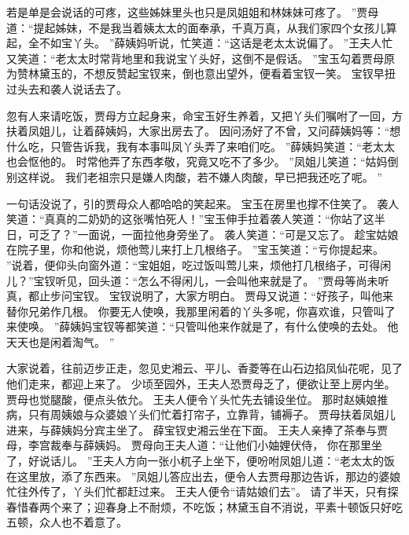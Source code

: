 若是单是会说话的可疼，这些姊妹里头也只是凤姐姐和林妹妹可疼了。
”贾母道：“提起姊妹，不是我当着姨太太的面奉承，千真万真，从我们家四个女孩儿算起，全不如宝丫头。
”薛姨妈听说，忙笑道：“这话是老太太说偏了。
”王夫人忙又笑道：“老太太时常背地里和我说宝丫头好，这倒不是假话。
”宝玉勾着贾母原为赞林黛玉的，不想反赞起宝钗来，倒也意出望外，便看着宝钗一笑。
宝钗早扭过头去和袭人说话去了。
\par
忽有人来请吃饭，贾母方立起身来，命宝玉好生养着，又把丫头们嘱咐了一回，方扶着凤姐儿，让着薛姨妈，大家出房去了。
因问汤好了不曾，又问薛姨妈等：“想什么吃，只管告诉我，我有本事叫凤丫头弄了来咱们吃。
”薛姨妈笑道：“老太太也会怄他的。
时常他弄了东西孝敬，究竟又吃不了多少。
”凤姐儿笑道：“姑妈倒别这样说。
我们老祖宗只是嫌人肉酸，若不嫌人肉酸，早已把我还吃了呢。
”\par
一句话没说了，引的贾母众人都哈哈的笑起来。
宝玉在房里也撑不住笑了。
袭人笑道：“真真的二奶奶的这张嘴怕死人！”宝玉伸手拉着袭人笑道：“你站了这半日，可乏了？”一面说，一面拉他身旁坐了。
袭人笑道：“可是又忘了。
趁宝姑娘在院子里，你和他说，烦他莺儿来打上几根络子。
”宝玉笑道：“亏你提起来。
”说着，便仰头向窗外道：“宝姐姐，吃过饭叫莺儿来，烦他打几根络子，可得闲儿？”宝钗听见，回头道：“怎么不得闲儿，一会叫他来就是了。
”贾母等尚未听真，都止步问宝钗。
宝钗说明了，大家方明白。
贾母又说道：“好孩子，叫他来替你兄弟作几根。
你要无人使唤，我那里闲着的丫头多呢，你喜欢谁，只管叫了来使唤。
”薛姨妈宝钗等都笑道：“只管叫他来作就是了，有什么使唤的去处。
他天天也是闲着淘气。
”\par
大家说着，往前迈步正走，忽见史湘云、平儿、香菱等在山石边掐凤仙花呢，见了他们走来，都迎上来了。
少顷至园外，王夫人恐贾母乏了，便欲让至上房内坐。
贾母也觉腿酸，便点头依允。
王夫人便令丫头忙先去铺设坐位。
那时赵姨娘推病，只有周姨娘与众婆娘丫头们忙着打帘子，立靠背，铺褥子。
贾母扶着凤姐儿进来，与薛姨妈分宾主坐了。
薛宝钗史湘云坐在下面。
王夫人亲捧了茶奉与贾母，李宫裁奉与薛姨妈。
贾母向王夫人道：“让他们小妯娌伏侍，
你在那里坐了，好说话儿。
”王夫人方向一张小杌子上坐下，便吩咐凤姐儿道：“老太太的饭在这里放，添了东西来。
”凤姐儿答应出去，便令人去贾母那边告诉，那边的婆娘忙往外传了，丫头们忙都赶过来。
王夫人便令“请姑娘们去”。
请了半天，只有探春惜春两个来了；迎春身上不耐烦，不吃饭；林黛玉自不消说，平素十顿饭只好吃五顿，众人也不着意了。

